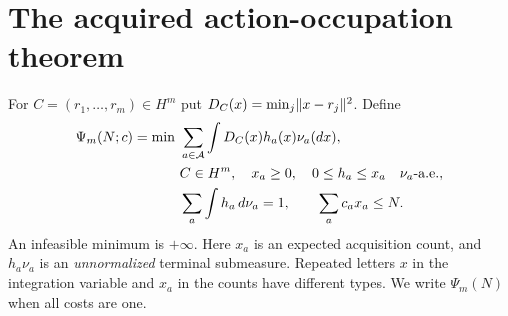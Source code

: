 \section{The acquired action-occupation theorem}\label{sec:central}
For $C=(r_1,\ldots,r_m)\in H^m$ put $D_C(x)=\min_j\lVert x-r_j\rVert^2$. Define
\begin{align}
 \Psi_m(N;c)=\min\ &\sum_{a\in\mathcal A}\int D_C(x)h_a(x)\nu_a(dx),\label{eq:profile}\\
 &C\in H^m,\quad x_a\ge0,\quad 0\le h_a\le x_a\quad\nu_a\text{-a.e.},\notag\\
 &\sum_a\int h_a\,d\nu_a=1,\qquad \sum_a c_ax_a\le N.\notag
\end{align}
An infeasible minimum is $+\infty$. Here $x_a$ is an expected acquisition count, and $h_a\nu_a$ is an \emph{unnormalized} terminal submeasure. Repeated letters $x$ in the integration variable and $x_a$ in the counts have different types. We write $\Psi_m(N)$ when all costs are one.


